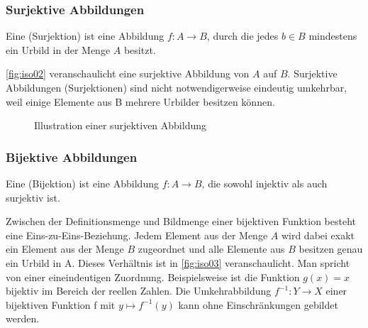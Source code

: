 \subsubsection{Surjektive Abbildungen}
\begin{df}Eine  (Surjektion) ist eine Abbildung $f : A \rightarrow B$, durch die jedes $b \in B$ mindestens ein Urbild in der Menge $A$ besitzt.\end{df}
\autoref{fig:iso02} veranschaulicht eine surjektive Abbildung von $A$ auf $B$.
Surjektive Abbildungen (Surjektionen) sind nicht notwendigerweise eindeutig umkehrbar, weil einige Elemente aus B mehrere Urbilder besitzen können.\\

\begin{figure}[!h]
\centering
{}
\caption{Illustration einer surjektiven Abbildung}\label{fig:iso02}
\end{figure}

\subsubsection{Bijektive Abbildungen}
\begin{df}Eine  (Bijektion) ist eine Abbildung $f : A \rightarrow B$, die sowohl injektiv als auch surjektiv ist.\end{df}

Zwischen der Definitionsmenge und Bildmenge einer bijektiven Funktion besteht eine Eins-zu-Eins-Beziehung. Jedem Element aus der Menge $A$ wird dabei exakt ein Element aus der Menge $B$ zugeordnet und alle Elemente aus $B$ besitzen genau ein Urbild in A. Dieses Verhältnis ist in \autoref{fig:iso03} veranschaulicht. Man spricht von einer eineindeutigen Zuordnung.
Beispielsweise ist die Funktion $g (x) = x$ bijektiv im Bereich der reellen Zahlen.
Die Umkehrabbildung $f^{-1} : Y \rightarrow X$ einer bijektiven Funktion f mit $y \mapsto f^{-1}(y)$ kann ohne Einschränkungen gebildet werden.

